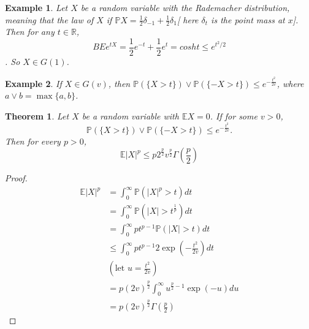 \documentclass[11pt]{article}
\def\BP{{\bf P}}
\def\BR{{\mathbb R}}
\def\BE{{\mathbb E}}
\def\BP{{\mathbb P}}
\newtheorem{theorem}{Theorem}[section]
\newtheorem{example}{Example}[section]
\begin{document}
\begin{example}
Let $X$ be a random variable with the Rademacher distribution, meaning that the law of $X$ if $\BP X = \frac{1}{2} \delta_{-1} + \frac{1}{2} \delta_1$[ here $\delta_t$ is the point mass at $x$]. Then for any $t \in \BR$, \[BE e^{tX} = \frac{1}{2} e^{-t} + \frac{1}{2} e^t = cosh t \leq e^{t^2 / 2}\]. So $X \in G(1)$.
\end{example}

\begin{example}
If $X \in G(v)$, then $\BP(\{X > t\}) \vee \BP(\{-X > t \}) \leq e^{-\frac{t^2}{2v}}$, where $a \vee b = \max \{a, b\}$.
\end{example}

\begin{theorem}
Let $X$ be a random variable with $\BE X = 0$. If for some $v > 0$,
\[
\BP(\{X > t\}) \vee \BP(\{-X > t\}) \leq e^{-\frac{t^2}{2v}}.
\]
Then for every $p > 0$,
\[
\BE |X|^p \leq p 2^{\frac{p}{2}} v^{\frac{p}{2}} \Gamma(\frac{p}{2})
\]
\end{theorem}

\begin{proof}
\[\begin{split}
\BE |X|^p &= \int_{0}^{\infty} \BP(|X|^p > t) dt \\
&= \int_{0}^{\infty} \BP(|X| > t^{\frac{1}{p}}) dt \\
&= \int_{0}^{\infty} pt^{p-1} \BP(|X| > t) dt \\
&\leq \int_{0}^{\infty} pt^{p-1} 2\exp(-\frac{t^2}{2v}) dt \\
&(\text{let } u = \frac{t^2}{2v}) \\
&= p(2v)^{\frac{p}{2}} \int_{0}^{\infty} u^{\frac{p}{2} - 1} \exp(-u) du \\
&= p(2v)^{\frac{p}{2}} \Gamma(\frac{p}{2})
\end{split} \]
\end{proof}
\end{document}
